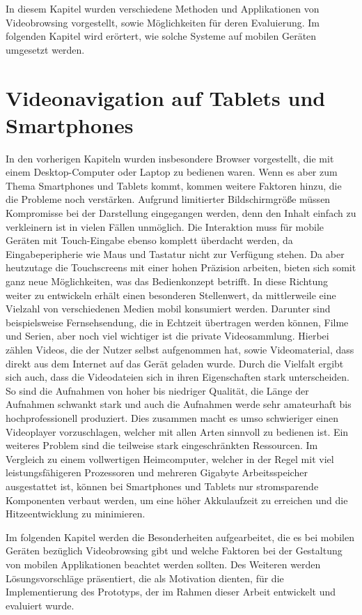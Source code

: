 \documentclass[11pt,a4paper]{report}
\begin{document}
In diesem Kapitel wurden verschiedene Methoden und Applikationen von Videobrowsing vorgestellt, sowie Möglichkeiten für deren Evaluierung. Im folgenden Kapitel wird erörtert, wie solche Systeme auf mobilen Geräten umgesetzt werden.

\chapter{Videonavigation auf Tablets und Smartphones}

In den vorherigen Kapiteln wurden insbesondere Browser vorgestellt, die mit einem Desktop-Computer oder Laptop zu bedienen waren. Wenn es aber zum Thema Smartphones und Tablets kommt, kommen weitere Faktoren hinzu, die die Probleme noch verstärken. Aufgrund limitierter Bildschirmgröße müssen Kompromisse bei der Darstellung eingegangen werden, denn den Inhalt einfach zu verkleinern ist in vielen Fällen unmöglich. Die Interaktion muss für mobile Geräten mit Touch-Eingabe ebenso komplett überdacht werden, da Eingabeperipherie wie Maus und Tastatur nicht zur Verfügung stehen. Da aber heutzutage die Touchscreens mit einer hohen Präzision arbeiten, bieten sich somit ganz neue Möglichkeiten, was das Bedienkonzept betrifft. In diese Richtung weiter zu entwickeln erhält einen besonderen Stellenwert, da mittlerweile eine Vielzahl von verschiedenen Medien mobil konsumiert werden. Darunter sind beispielsweise Fernsehsendung, die in Echtzeit übertragen werden können, Filme und Serien, aber noch viel wichtiger ist die private Videosammlung. Hierbei zählen Videos, die der Nutzer selbst aufgenommen hat, sowie Videomaterial, dass direkt aus dem Internet auf das Gerät geladen wurde. Durch die Vielfalt ergibt sich auch, dass die Videodateien sich in ihren Eigenschaften stark unterscheiden. So sind die Aufnahmen von hoher bis niedriger Qualität, die Länge der Aufnahmen schwankt stark und auch die Aufnahmen werde sehr amateurhaft bis hochprofessionell produziert. Dies zusammen macht es umso schwieriger einen Videoplayer vorzuschlagen, welcher mit allen Arten sinnvoll zu bedienen ist. Ein weiteres Problem sind die teilweise stark eingeschränkten Ressourcen. Im Vergleich zu einem vollwertigen Heimcomputer, welcher in der Regel mit viel leistungsfähigeren Prozessoren und mehreren Gigabyte Arbeitsspeicher ausgestattet ist, können bei Smartphones und Tablets nur stromsparende Komponenten verbaut werden, um eine höher Akkulaufzeit zu erreichen und die Hitzeentwicklung zu minimieren. \cite{hurst2007interactive}

Im folgenden Kapitel werden die Besonderheiten aufgearbeitet, die es bei mobilen Geräten bezüglich Videobrowsing gibt und welche Faktoren bei der Gestaltung von mobilen Applikationen beachtet werden sollten. Des Weiteren werden Lösungsvorschläge präsentiert, die als Motivation dienten, für die Implementierung des Prototyps, der im Rahmen dieser Arbeit entwickelt und evaluiert wurde.
\end{document}
